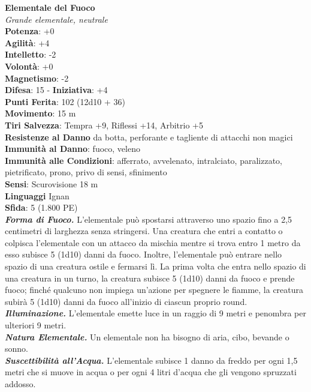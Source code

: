 \begin{multicols}{2}
\medskip\textbf{Elementale del Fuoco}\\
\emph{Grande elementale, neutrale}\\
\textbf{Potenza}: +0\\
\textbf{Agilità}: +4\\
\textbf{Intelletto}: -2\\
\textbf{Volontà}: +0\\
\textbf{Magnetismo}: -2\\
\textbf{Difesa}: 15 - \textbf{Iniziativa}: +4\\
\textbf{Punti Ferita}: 102 (12d10 + 36)\\
\textbf{Movimento}: 15 m\\
\textbf{Tiri Salvezza}: Tempra +9, Riflessi +14, Arbitrio +5\\
\textbf{Resistenze al Danno} da botta, perforante e tagliente di attacchi non magici\\
\textbf{Immunità al Danno}: fuoco, veleno\\
\textbf{Immunità alle Condizioni}: afferrato, avvelenato, intralciato, paralizzato, pietrificato, prono, privo di sensi, sfinimento \\
\textbf{Sensi}: Scurovisione 18 m\\
\textbf{Linguaggi} Ignan\\
\textbf{Sfida}: 5 (1.800 PE)\smallskip\\
\emph{\textbf{Forma di Fuoco.}} L'elementale può spostarsi attraverso uno spazio fino a 2,5 centimetri di larghezza senza stringersi. Una creatura che entri a contatto o colpisca l'elementale con un attacco da mischia mentre si trova entro 1 metro da esso subisce 5 (1d10) danni da fuoco. Inoltre, l'elementale può entrare nello spazio di una creatura ostile e fermarsi lì. La prima volta che entra nello spazio di una creatura in un turno, la creatura subisce 5 (1d10) danni da fuoco e prende fuoco; finché qualcuno non impiega un'azione per spegnere le fiamme, la creatura subirà 5 (1d10) danni da fuoco all'inizio di ciascun proprio round.\\
\emph{\textbf{Illuminazione.}} L'elementale emette luce in un raggio di 9 metri e penombra per ulteriori 9 metri.\\
\emph{\textbf{Natura Elementale.}} Un elementale non ha bisogno di aria, cibo, bevande o sonno.\\
\emph{\textbf{Suscettibilità all'Acqua.}} L'elementale subisce 1 danno da freddo per ogni 1,5 metri che si muove in acqua o per ogni 4 litri d'acqua che gli vengono spruzzati addosso.\\

\end{multicols}

